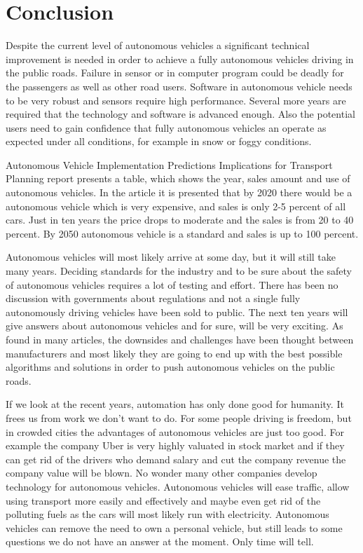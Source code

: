 \documentclass[english]{tktltiki}
\begin{document}
\section{Conclusion}
Despite the current level of autonomous vehicles a significant technical 
improvement is needed in order to achieve a fully autonomous vehicles driving in 
the public roads. \cite{transportpolicy} Failure in sensor or in computer 
program could be deadly for the passengers as well as other road users. Software 
in autonomous vehicle needs to be very robust and sensors require high 
performance. Several more years are required that the technology and software is 
advanced enough. Also the potential users need to gain confidence that fully 
autonomous vehicles an operate as expected under all conditions, for example in 
snow or foggy conditions. 

Autonomous Vehicle Implementation Predictions Implications for Transport 
Planning report presents a table, which shows the year, sales amount and use of 
autonomous vehicles. \cite{transportpolicy} In the article it is presented that 
by 2020 there would be a autonomous vehicle which is very expensive, and sales 
is only 2-5 percent of all cars. Just in ten years the price drops to moderate 
and the sales is from 20 to 40 percent. By 2050 autonomous vehicle is a standard 
and sales is up to 100 percent.

Autonomous vehicles will most likely arrive at some day, but it will still take 
many years. Deciding standards for the industry and to be sure about the safety 
of autonomous vehicles requires a lot of testing and effort. There has been no 
discussion with governments about regulations and not a single fully 
autonomously driving vehicles have been sold to public. The next ten years will 
give answers about autonomous vehicles and for sure, will be very exciting. As 
found in many articles, the downsides and challenges have been thought between 
manufacturers and most likely they are going to end up with the best possible 
algorithms and solutions in order to push autonomous vehicles on the public 
roads. 

If we look at the recent years, automation has only done good for humanity. It 
frees us from work we don't want to do. For some people driving is freedom, but 
in crowded cities the advantages of autonomous vehicles are just too good. For 
example the company Uber is very highly valuated in stock market and if they can 
get rid of the drivers who demand salary and cut the company revenue the company 
value will be blown. No wonder many other companies develop technology for 
autonomous vehicles. \cite{transportpolicy}  Autonomous vehicles will ease 
traffic, allow using transport more easily and effectively and maybe even get 
rid of the polluting fuels as the cars will most likely run with electricity. 
Autonomous vehicles can remove the need to own a personal vehicle, but still 
leads to some questions we do not have an answer at the moment. Only time will 
tell.


\nocite{*}



\lastpage

\appendices

\pagestyle{empty}
\end{document}
